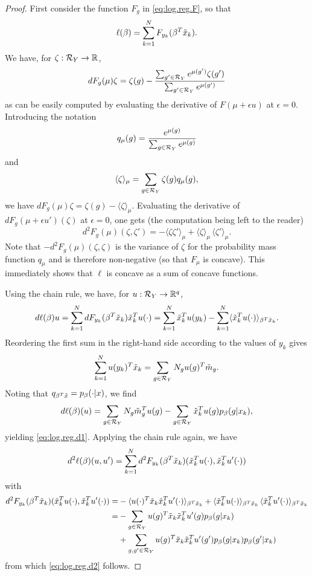 \begin{proof}
First consider the function $F_g$ in \cref{eq:log.reg.F}, so that 
\[
\ell(\beta) = \sum_{k=1}^N F_{y_k}(\beta^T{\tilde{x}}_k).
\]
We have, for $\zeta: {\mathcal R}_Y\to {\mathbb{R}}$, 
\[
dF_g(\mu)\zeta =  \zeta(g) - \frac{\sum_{g'\in {\mathcal R}_Y} e^{\mu(g')} \zeta(g')}{\sum_{g'\in {\mathcal R}_Y} e^{\mu(g')}}
\]
as can be easily computed by evaluating the derivative of $F(\mu+\epsilon u)$ at $\epsilon=0$. Introducing the notation
\[
q_\mu(g) = \frac{e^{\mu(g)}}{\sum_{g\in {\mathcal R}_Y} e^{\mu(g)}}
\]
and
\[
\langle \zeta \rangle_\mu = \sum_{g\in {\mathcal R}_Y} \zeta(g) q_\mu(g),
\]
we have $dF_g(\mu)\zeta =  \zeta(g) - \langle \zeta \rangle_\mu $. 
Evaluating the derivative of $dF_g(\mu+\epsilon u')(\zeta)$ at $\epsilon=0$, one gets (the computation being left to the reader)
\begin{equation}
\label{eq:d2.Fg}
d^2F_g(\mu)(\zeta, \zeta') =   - \langle \zeta \zeta' \rangle_\mu + \langle \zeta \rangle_\mu \, \langle \zeta' \rangle_\mu.
\end{equation}
Note that $-d^2F_g(\mu)(\zeta, \zeta)$ is the variance of $\zeta$ for the probability mass function $q_\mu$ and is therefore non-negative (so that $F_\mu$ is concave). This immediately shows that $\ell$ is concave as a sum of concave functions.  



Using the chain rule, we have, for $u:{\mathcal R}_Y\to {\mathbb{R}}^q$,
\[
d\ell(\beta)u = \sum_{k=1}^N dF_{y_k}(\beta^T{\tilde{x}}_k){\tilde{x}}_k^Tu(\cdot) = \sum_{k=1}^N {\tilde{x}}_k^Tu(y_k) - \sum_{k=1}^N \langle {\tilde{x}}_k^T u(\cdot) \rangle_{\beta^T{\tilde{x}}_k}.
\]
Reordering the first sum in the right-hand side according to the values of $y_k$ gives
\[
\sum_{k=1}^N u(y_k)^T{\tilde{x}}_k = \sum_{g\in{\mathcal R}_Y} N_g u(g)^T {\tilde{m}}_g.
\]
Noting that $q_{\beta^T{\tilde{x}}} = p_\beta(\cdot|x)$, we find
\[
d\ell(\beta)(u) =  \sum_{g\in{\mathcal R}_Y} N_g {\tilde{m}}_g^T u(g) - \sum_{g\in{\mathcal R}_Y} {\tilde{x}}_k^Tu(g) p_\beta(g|x_k),
\]
yielding \cref{eq:log.reg.d1}. Applying the chain rule again, we have
\begin{equation}
\label{eq:d2.ell.F}
d^2\ell(\beta)(u, u') = \sum_{k=1}^N d^2F_{y_k}(\beta^T{\tilde{x}}_k)({\tilde{x}}_k^Tu(\cdot), {\tilde{x}}_k^Tu'(\cdot))
\end{equation}
with
\begin{align*}
d^2F_{y_k}(\beta^T{\tilde{x}}_k)({\tilde{x}}_k^Tu(\cdot), {\tilde{x}}_k^Tu'(\cdot)) =& - \langle u(\cdot)^T {\tilde{x}}_k{\tilde{x}}_k^T u'(\cdot)  \rangle_{\beta^T{\tilde{x}}_k} + \langle {\tilde{x}}_k^Tu(\cdot) \rangle_{\beta^T{\tilde{x}}_k} \, \langle {\tilde{x}}_k^Tu'(\cdot) \rangle_{\beta^T{\tilde{x}}_k}\\
 =& - \sum_{g\in {\mathcal R}_Y} u(g)^T {\tilde{x}}_k{\tilde{x}}_k^T u'(g) p_\beta(g|x_k) \\
& + \sum_{g,g'\in{\mathcal R}_Y} u(g)^T {\tilde{x}}_k{\tilde{x}}_k^T u'(g') p_\beta(g|x_k) p_\beta(g'|x_k)
\end{align*}
from which \cref{eq:log.reg.d2} follows.
\end{proof}

